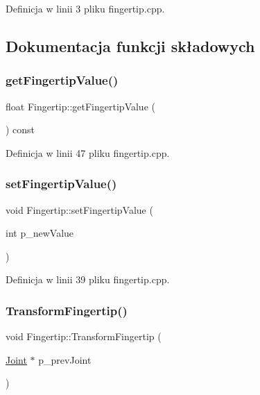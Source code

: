 Definicja w linii 3 pliku fingertip.\+cpp.



\subsection{Dokumentacja funkcji składowych}
\mbox{\label{class_fingertip_a3ec55016e28f9fbce847baa668c44868}} 
\subsubsection{\texorpdfstring{get\+Fingertip\+Value()}{getFingertipValue()}}
{\footnotesize\ttfamily float Fingertip\+::get\+Fingertip\+Value (\begin{DoxyParamCaption}{ }\end{DoxyParamCaption}) const}



Definicja w linii 47 pliku fingertip.\+cpp.

\mbox{\label{class_fingertip_aa2823945458eb8a97f9568934bfcc1d5}} 
\subsubsection{\texorpdfstring{set\+Fingertip\+Value()}{setFingertipValue()}}
{\footnotesize\ttfamily void Fingertip\+::set\+Fingertip\+Value (\begin{DoxyParamCaption}\item[{int}]{p\+\_\+new\+Value }\end{DoxyParamCaption})}



Definicja w linii 39 pliku fingertip.\+cpp.

\mbox{\label{class_fingertip_aeecbae45b84b2ab9840df15b6541a21d}} 
\subsubsection{\texorpdfstring{Transform\+Fingertip()}{TransformFingertip()}}
{\footnotesize\ttfamily void Fingertip\+::\+Transform\+Fingertip (\begin{DoxyParamCaption}\item[{\hyperlink{class_joint}{Joint} $\ast$}]{p\+\_\+prev\+Joint }\end{DoxyParamCaption})}



